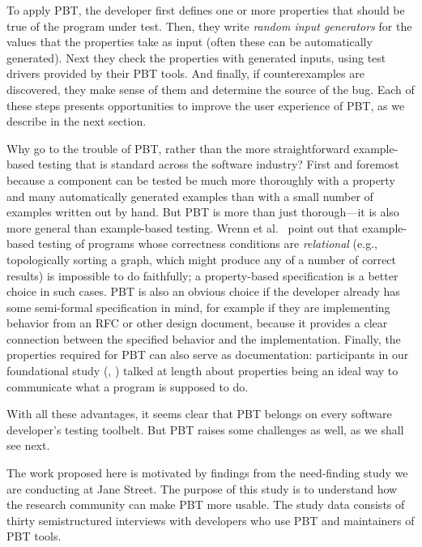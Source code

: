 To apply PBT, the developer first defines one or more properties that
should be true of the program under test. Then, they write {\em random
  input generators} for the values that the properties take as input
(often these can be automatically generated). Next they check the
properties with generated inputs, using test drivers provided by their
PBT tools. And finally, if counterexamples are discovered, they make
sense of them and determine the source of the bug.  Each of these
steps presents opportunities to improve the user experience of PBT, as
we describe in the next section.

\smallskip

Why go to the trouble of PBT, rather than the more straightforward
example-based testing that is standard across the software industry?
First and foremost because a component can be tested be much more
thoroughly with a property and many automatically generated examples
than with a small number of examples written out by hand.
But
PBT is more than just thorough---it is also more general than example-based
testing. Wrenn et al.~\cite{wrenn2021using} point out that example-based testing
of programs whose correctness conditions are {\em relational} (e.g.,
topologically sorting a graph, which might
produce any of a number of correct results) is impossible to do
faithfully; a property-based specification is a better choice in
such cases.
PBT is also
an obvious choice if
the developer already has some semi-formal
specification in mind, for example if they are implementing behavior from an RFC or
other design document, because it provides a clear connection between the
specified behavior and the implementation.
Finally, the
properties required for PBT can also serve as documentation:
participants in our foundational study (, )
talked at length about properties being an ideal way to communicate what a
program is supposed to do.

With all these advantages, it seems clear that PBT belongs on every
software developer's testing toolbelt.  But PBT raises some challenges
as well, as we shall see next.

%
The work proposed here is motivated by findings from the
need-finding study we are conducting at Jane Street. The purpose of this
study is to understand how the research community can make PBT more
usable. The study data consists of thirty semistructured interviews
with developers who use PBT and maintainers of PBT tools.

